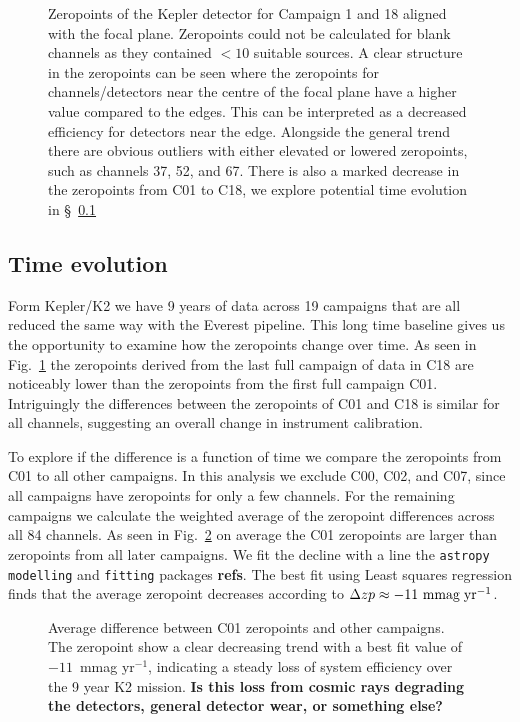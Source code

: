 \documentclass{aastex63}
\begin{document}
\begin{figure}
    \caption{Zeropoints of the Kepler detector for Campaign 1 and 18 aligned with the focal plane. Zeropoints could not be calculated for blank channels as they contained $<10$ suitable sources.  A clear structure in the zeropoints can be seen where the zeropoints for channels/detectors near the centre of the focal plane have a higher value compared to the edges. This can be interpreted as a decreased efficiency for detectors near the edge. Alongside the general trend there are obvious outliers with either elevated or lowered zeropoints, such as channels 37, 52, and 67. There is also a marked decrease in the zeropoints from C01 to C18, we explore potential time evolution in \S~\ref{sec:time_evo}}
    \label{fig:zp_fp}
\end{figure}





\subsection{Time evolution} \label{sec:time_evo}
Form Kepler/K2 we have 9 years of data across 19 campaigns that are all reduced the same way with the Everest pipeline. This long time baseline gives us the opportunity to examine how the zeropoints change over time. As seen in Fig.~\ref{fig:zp_fp} the zeropoints derived from the last full campaign of data in C18 are noticeably lower than the zeropoints from the first full campaign C01. Intriguingly the differences between the zeropoints of C01 and C18 is similar for all channels, suggesting an overall change in instrument calibration.

To explore if the difference is a function of time we compare the zeropoints from C01 to all other campaigns. In this analysis we exclude C00, C02, and C07, since all campaigns have zeropoints for only a few channels. For the remaining campaigns we calculate the weighted average of the zeropoint differences across all 84 channels. As seen in Fig.~\ref{fig:zp_evo} on average the C01 zeropoints are larger than zeropoints from all later campaigns. We fit the decline with a line the \texttt{astropy} \texttt{modelling} and \texttt{fitting} packages \textbf{refs}. The best fit using Least squares regression finds that the average zeropoint decreases according to $\Delta zp \approx -11~\rm mmag\; yr^{-1}$.



\begin{figure}
    \caption{Average difference between C01 zeropoints and other campaigns. The zeropoint show a clear decreasing trend with a best fit value of $-11$~mmag yr$^{-1}$, indicating a steady loss of system efficiency over the 9 year K2 mission. \textbf{Is this loss from cosmic rays degrading the detectors, general detector wear, or something else?}}
    \label{fig:zp_evo}
\end{figure}
\end{document}
